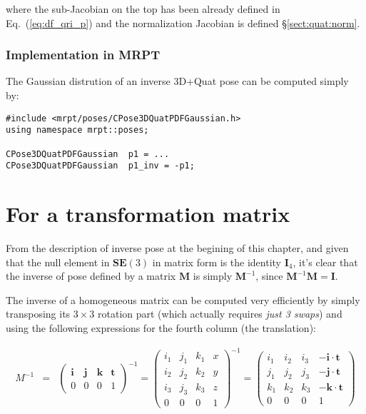 \documentclass[a4paper,11pt]{report}
\begin{document}
\noindent where the sub-Jacobian on the top has been already defined in Eq.~(\ref{eq:df_qri_p}) and the normalization Jacobian 
is defined \S \ref{sect:quat:norm}.



\subsubsection{Implementation in MRPT}

The Gaussian distrution of an inverse 3D+Quat pose can be computed simply by:

\begin{lstlisting}
#include <mrpt/poses/CPose3DQuatPDFGaussian.h>
using namespace mrpt::poses;

CPose3DQuatPDFGaussian  p1 = ...
CPose3DQuatPDFGaussian  p1_inv = -p1;
\end{lstlisting}



\section{For a transformation matrix}
\label{sect:inverse:mat}

From the description of inverse pose at the begining of this chapter, and given
that the null element in $\mathbf{SE}(3)$ in matrix form is the identity $\mathbf{I}_4$,
it's clear that the inverse of pose defined by a matrix $\mathbf{M}$ is simply $\mathbf{M}^{-1}$,
since $\mathbf{M}^{-1}\mathbf{M}=\mathbf{I}$.

The inverse of a homogeneous matrix can be computed very efficiently by
simply transposing its $3 \times 3$ rotation part (which actually requires \emph{just 3 swaps})
and using the following expressions for the fourth column (the translation):

\begin{eqnarray}
M^{-1} &=&
\left(
  \begin{array}{ccc|c}
   \mathbf{i} & \mathbf{j} & \mathbf{k} & \mathbf{t} \\
\hline
   0 & 0 & 0 & 1
  \end{array}
\right) ^{-1}
=
\left(
  \begin{array}{ccc|c}
   i_1 & j_1 & k_1 & x \\
   i_2 & j_2 & k_2 & y \\
   i_3 & j_3 & k_3 & z \\
\hline
   0 & 0 & 0 & 1
  \end{array}
\right) ^{-1}
=
\left(
  \begin{array}{ccc|c}
   i_1 & i_2 & i_3   & -\mathbf{i} \cdot \mathbf{t} \\
   j_1 & j_2 & j_3   & -\mathbf{j} \cdot \mathbf{t} \\
   k_1 & k_2 & k_3   & -\mathbf{k} \cdot \mathbf{t} \\
\hline
   0 & 0 & 0 & 1
  \end{array}
\right)
\end{eqnarray}
\end{document}
